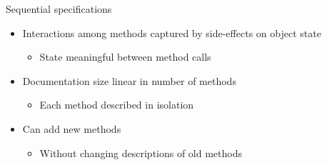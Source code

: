 \begin{frame}[t]{Sequential specifications}

\begin{itemize}
  \item Interactions among methods captured by side-effects on object state
  \begin{itemize}
    \item State meaningful between method calls    
  \end{itemize}

  \item Documentation size linear in number of methods
  \begin{itemize}
    \item Each method described in isolation
  \end{itemize}

  \item Can add new methods
  \begin{itemize}
    \item Without changing descriptions of old methods
  \end{itemize}
\end{itemize}

\end{frame}


